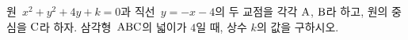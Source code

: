 원~$x^2+y^2+4y+k=0$과 직선~$y=-x-4$의 두 교점을 각각 $\mathrm{A}$, $\mathrm{B}$라 하고, 원의 중심을 $\mathrm{C}$라 하자. 삼각형~$\mathrm{ABC}$의 넓이가 $4$일 때, 상수 $k$의 값을 구하시오. 
